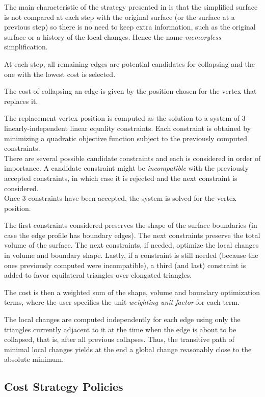 The main characteristic of the strategy presented in
\cite{cgal:lt-fmeps-98,cgal:lt-ems-99} is that the simplified surface
is not compared at each step with the original surface (or the surface
at a previous step) so there is no need to keep extra information,
such as the original surface or a history of the local changes. Hence
the name {\em memoryless} simplification.

At each step, all remaining edges are potential candidates for 
collapsing and the one with the lowest cost is selected.

The cost of collapsing an edge is given by the position chosen for the
vertex that replaces it. 

The replacement vertex position is computed as
the solution to a system of 3 linearly-independent linear equality constraints.
Each constraint is obtained by minimizing a quadratic objective function
subject to the previously computed constraints.\\
There are several possible candidate constraints and each is considered in order of importance.
A candidate constraint might be {\em incompatible} with the previously accepted constraints,
in which case it is rejected and the next constraint is considered.\\
Once 3 constraints have been accepted, the system is solved for the vertex position.

The first constraints considered preserves the shape of the surface boundaries 
(in case the edge profile has boundary edges).
The next constraints preserve the total volume of the surface.
The next constraints, if needed, optimize the local changes in volume and boundary shape.
Lastly, if a constraint is still needed (because the ones previously computed were incompatible),
a third (and last) constraint is added to favor equilateral triangles over elongated triangles.

The cost is then a weighted sum of the shape, volume and boundary optimization terms, where the user specifies the unit {\em weighting unit factor} for each term.

The local changes are computed independently for each edge using only
the triangles currently adjacent to it at the time when the edge 
is about to be collapsed, that is, after all previous collapses.
Thus, the transitive path of minimal local changes yields at
the end a global change reasonably close to the absolute minimum.

\subsection{Cost Strategy Policies}

